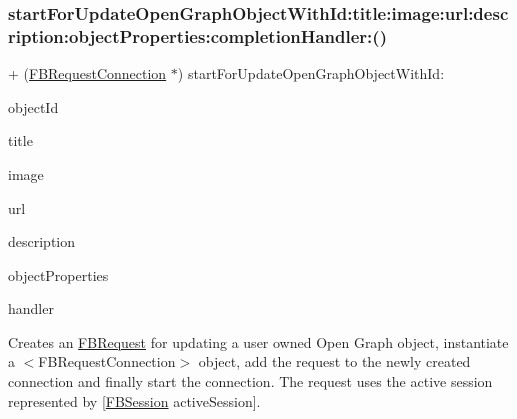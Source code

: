 \subsubsection{\texorpdfstring{start\+For\+Update\+Open\+Graph\+Object\+With\+Id\+:title\+:image\+:url\+:description\+:object\+Properties\+:completion\+Handler\+:()}{startForUpdateOpenGraphObjectWithId:title:image:url:description:objectProperties:completionHandler:()}\hspace{0.1cm}{\footnotesize\ttfamily [1/5]}}
{\footnotesize\ttfamily + (\hyperlink{interfaceFBRequestConnection}{F\+B\+Request\+Connection} $\ast$) start\+For\+Update\+Open\+Graph\+Object\+With\+Id\+: \begin{DoxyParamCaption}\item[{(id)}]{object\+Id }\item[{title:(N\+S\+String $\ast$)}]{title }\item[{image:(id)}]{image }\item[{url:(id)}]{url }\item[{description:(N\+S\+String $\ast$)}]{description }\item[{objectProperties:(N\+S\+Dictionary $\ast$)}]{object\+Properties }\item[{completionHandler:(F\+B\+Request\+Handler)}]{handler }\end{DoxyParamCaption}}

Creates an {\ttfamily \hyperlink{interfaceFBRequest}{F\+B\+Request}} for updating a user owned Open Graph object, instantiate a $<$\+F\+B\+Request\+Connection$>$ object, add the request to the newly created connection and finally start the connection. The request uses the active session represented by {\ttfamily \mbox{[}\hyperlink{interfaceFBSession}{F\+B\+Session} active\+Session\mbox{]}}.


